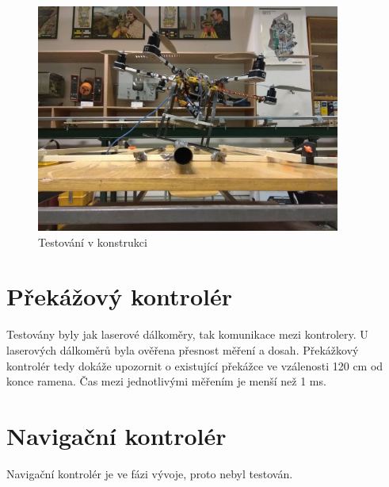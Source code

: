 \begin{figure}[h]
	\centering
	\includegraphics[width=10cm]{pictures/pidtest.jpg}
	\caption{Testování v konstrukci}
\end{figure}

\section{Překážový kontrolér}
Testovány byly jak laserové dálkoměry, tak komunikace mezi kontrolery. U laserových dálkoměrů byla ověřena přesnost měření a dosah. Překážkový kontrolér tedy dokáže upozornit o existující překážce ve vzálenosti 120 cm od konce ramena. Čas mezi jednotlivými měřením je menší než 1 ms.\\

\section{Navigační kontrolér}
Navigační kontrolér je ve fázi vývoje, proto nebyl testován.\\

